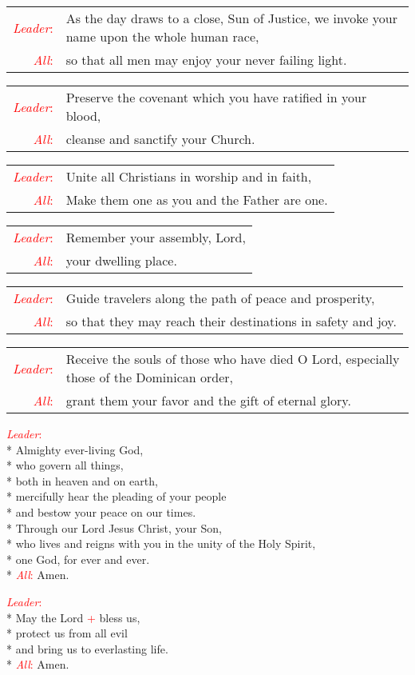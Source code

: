 \documentclass[letterpaper,14pt]{extarticle}
\newcommand{\sidestar}[1]{\textcolor{red}{\textit{#1}:}}
\newcommand{\rednote}[1]{\textcolor{red}{#1}}
\newcommand{\intercession}[2]{
	\begin{tabular}[h]{r p{4.25in}}
		\sidestar{Leader} & #1 \\
		\sidestar{All} & #2
	\end{tabular}}
\begin{document}
\intercession{As the day draws to a close, Sun of Justice, we invoke your name upon the whole human race,}
{so that all men may enjoy your never failing light.}

\intercession{Preserve the covenant which you have ratified in your blood,}
{cleanse and sanctify your Church.}

\intercession{Unite all Christians in worship and in faith,}
{Make them one as you and the Father are one.}

\intercession{Remember your assembly, Lord,}
{your dwelling place.}

\intercession{Guide travelers along the path of peace and prosperity,}
{so that they may reach their destinations in safety and joy.}

\intercession{Receive the souls of those who have died O Lord, especially those of the Dominican order,}
{grant them your favor and the gift of eternal glory.}

	

\sidestar{Leader}\\*
Almighty ever-living God,\\*
who govern all things,\\*
both in heaven and on earth,\\*
mercifully hear the pleading of your people\\*
and bestow your peace on our times.\\*
Through our Lord Jesus Christ, your Son,\\*
who lives and reigns with you in the unity of the Holy Spirit,\\*
one God, for ever and ever.\\*
\sidestar{All} Amen.


\sidestar{Leader}\\*
May the Lord \rednote{+} bless us, \\*
protect us from all evil \\*
and bring us to everlasting life. \\*
\sidestar{All} Amen.
\end{document}
